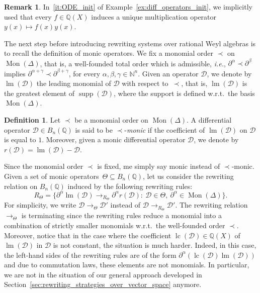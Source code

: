 \documentclass[11pt]{article}
\theoremstyle{definition}
\newtheorem{definition}[theorem]{Definition}
\newtheorem{remark}[theorem]{Remark}
\newcommand\ie{\emph{i.e.}}
\newcommand\wrt{w.r.t.}
\newcommand\D{\mathcal{D}}
\DeclareMathOperator{\supp}{supp}
\DeclareMathOperator{\lm}{lm}
\DeclareMathOperator{\lc}{lc}
\newcommand\Q{\mathbb{Q}}
\newcommand\N{\mathbb{N}}
\newcommand\Weyl[1]{B_{#1}(\Q)}
\newcommand\monBasis{\Mon(\Delta)}
\DeclareMathOperator{\Mon}{Mon}
\newcommand\rewTheta{\to_\Theta}
\newcommand\RTheta{R_{\Theta}}
\begin{document}
\begin{remark}
  In~\ref{it:ODE_init} of Example~\ref{ex:diff_operators_init}, we
  implicitly used that every $f\in\Q(X)$ induces a unique multiplication
  operator $y(x)\mapsto f(x)y(x)$.
\end{remark}
\smallskip

The next step before introducing rewriting systems over rational Weyl
algebras is to recall the definition of monic operators. We fix a
monomial order $\prec$ on $\monBasis$, that is, a well-founded total 
order which is admissible, \ie, $\partial^{\alpha}\prec\partial^{\beta}$
implies $\partial^{\alpha+\gamma}\prec\partial^{\beta+\gamma}$, for every
$\alpha,\beta,\gamma\in\N^n$. Given an operator $\D$, we denote by
$\lm(\D)$ the leading monomial of $\D$ with respect to~$\prec$, that 
is, $\lm(\D)$ is the greatest element of $\supp(\D)$, where the support 
is defined \wrt\ the basis $\monBasis$. 
\smallskip

\begin{definition}
  Let $\prec$ be a monomial order on $\monBasis$. A differential
  operator $\D\in\Weyl{n}$ is said to be $\prec$-{\em monic} if the
  coefficient of $\lm(\D)$ on $\D$ is equal to $1$. Moreover, given a
  monic differential operator $\D$, we denote by $r(\D)=\lm(\D)-\D$.
\end{definition}
\smallskip

Since the monomial order $\prec$ is fixed, me simply say monic instead of
$\prec$-monic. Given a set of monic operators~$\Theta\subseteq\Weyl{n}$,
let us consider the rewriting relation on $\Weyl{n}$ induced by the
following rewriting rules: 
\begin{equation}\label{equ:rewTheta}
  \RTheta=\Big\{\partial^\alpha\lm(\D)\to_{\RTheta}\partial^\alpha
  r(\D):\ \D\in\Theta,\ \partial^\alpha\in\Mon(\Delta)\Big\}.
\end{equation}
For simplicity, we write $\D\rewTheta\D'$ instead of
$\D\to_{R_\Theta}\D'$. The rewriting relation $\rewTheta$ is terminating
since the rewriting rules reduce a monomial into a combination of
strictly smaller monomials \wrt\ the well-founded order $\prec$.
Moreover, notice that in the case where the coefficient $\lc(\D)\in\Q(X)$
of~$\lm(\D)$ in $\D$ is not constant, the situation is much harder.
Indeed, in this case, the left-hand sides of the rewriting rules are of
the form $\partial^\alpha(\lc(\D)\lm(\D))$ and due to commutation laws,
these elements are not monomials. In particular, we are not in the
situation of our general approach developed in  
Section~\ref{sec:rewriting_strategies_over_vector_space} anymore.
\medskip
\end{document}
